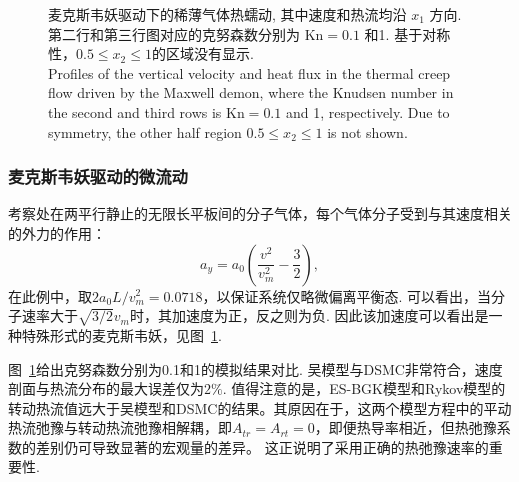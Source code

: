 \begin{figure}[t]
	\caption{ 
		麦克斯韦妖驱动下的稀薄气体热蠕动, 其中速度和热流均沿 $ x_1 $ 方向. 第二行和第三行图对应的克努森数分别为  $ \text{Kn}=0.1 $ 和1. 基于对称性，$0.5\le{}x_2\le1$的区域没有显示. \\
		Profiles of the vertical velocity and heat flux in the thermal creep flow driven by the Maxwell demon, where the Knudsen number in the second and third rows is $\text{Kn}=0.1$ and 1, respectively. Due to symmetry, the other half region $0.5\le{}x_2\le1$ is not shown.
	}
	\label{fig:TC1D}
\end{figure}

\subsubsection{麦克斯韦妖驱动的微流动}

考察处在两平行静止的无限长平板间的分子气体，每个气体分子受到与其速度相关的外力的作用：
\begin{equation}
a_y=a_0\left(\frac{v^2}{v^2_m}-\frac{3}{2}\right),
\end{equation}
在此例中，取${2{a_0}{L}/{v^2_m}=0.0718}$，以保证系统仅略微偏离平衡态. 可以看出，当分子速率大于$\sqrt{3/2}v_m$时，其加速度为正，反之则为负. 因此该加速度可以看出是一种特殊形式的麦克斯韦妖，见图~\ref{fig:TC1D}. 


图~\ref{fig:TC1D}给出克努森数分别为0.1和1的模拟结果对比. 吴模型与DSMC非常符合，速度剖面与热流分布的最大误差仅为$ 2\% $. 值得注意的是，ES-BGK模型和Rykov模型的转动热流值远大于吴模型和DSMC的结果。其原因在于，这两个模型方程中的平动热流弛豫与转动热流弛豫相解耦，即$A_{tr}=A_{rt}=0$，即便热导率相近，但热弛豫系数的差别仍可导致显著的宏观量的差异。 这正说明了采用正确的热弛豫速率的重要性.






